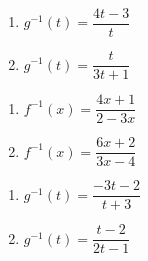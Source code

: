 \documentclass{ximera}
\begin{document}
\begin{multicols}{2}
\begin{enumerate}
\setcounter{enumi}{\value{HW}}

\item $g^{-1}(t) = \dfrac{4t-3}{t}$
\item $g^{-1}(t) = \dfrac{t}{3t+1}$

\setcounter{HW}{\value{enumi}}
\end{enumerate}
\end{multicols}

\begin{multicols}{2}
\begin{enumerate}
\setcounter{enumi}{\value{HW}}

\item $f^{-1}(x) = \dfrac{4x+1}{2-3x}$
\item $f^{-1}(x) = \dfrac{6x + 2}{3x - 4}$

\setcounter{HW}{\value{enumi}}
\end{enumerate}
\end{multicols}

\begin{multicols}{2}
\begin{enumerate}
\setcounter{enumi}{\value{HW}}

\item $g^{-1}(t) = \dfrac{-3t - 2}{t + 3}$
\item $g^{-1}(t) = \dfrac{t-2}{2t-1}$ 

\setcounter{HW}{\value{enumi}}
\end{enumerate}
\end{multicols}
\end{document}

